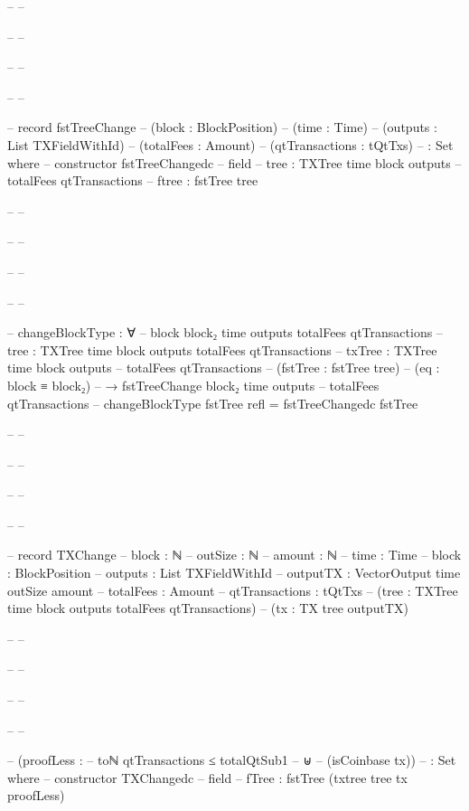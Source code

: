 \documentclass{beamer}
\begin{document}
{\begin{frame}
\begin{code}
-- -- \end{code}
-- -- \end{frame}
-- -- \begin{frame}
-- -- \begin{code}

--       record fstTreeChange
--         (block : BlockPosition)
--         (time : Time)
--         (outputs : List TXFieldWithId)
--         (totalFees : Amount)
--         (qtTransactions : tQtTxs)
--         : Set where
--         constructor fstTreeChangedc
--         field
--           {tree}      : TXTree time block outputs
--             totalFees qtTransactions
--           ftree       : fstTree tree

-- -- \end{code}
-- -- \end{frame}
-- -- \begin{frame}
-- -- \begin{code}

--       changeBlockType : ∀
--         {block block₂ time outputs totalFees qtTransactions}
--         {tree : TXTree time block outputs totalFees qtTransactions}
--         {txTree : TXTree time block outputs
--           totalFees qtTransactions}
--         (fstTree : fstTree tree)
--         (eq : block ≡ block₂)
--         → fstTreeChange block₂ time outputs
--           totalFees qtTransactions
--       changeBlockType fstTree refl = fstTreeChangedc fstTree

-- -- \end{code}
-- -- \end{frame}
-- -- \begin{frame}
-- -- \begin{code}

--       record TXChange
--         {block : ℕ}
--         {outSize : ℕ}
--         {amount : ℕ}
--         {time : Time}
--         {block : BlockPosition}
--         {outputs : List TXFieldWithId}
--         {outputTX : VectorOutput time outSize amount}
--         {totalFees : Amount}
--         {qtTransactions : tQtTxs}
--         (tree : TXTree time block outputs totalFees qtTransactions)
--         (tx : TX tree outputTX)

-- -- \end{code}
-- -- \end{frame}
-- -- \begin{frame}
-- -- \begin{code}

--         (proofLess :
--           toℕ qtTransactions ≤ totalQtSub1
--           ⊎
--           (isCoinbase tx))
--         : Set where
--         constructor TXChangedc
--         field
--           fTree                 : fstTree (txtree tree tx proofLess)


\end{code}
\end{frame}}
\end{document}
